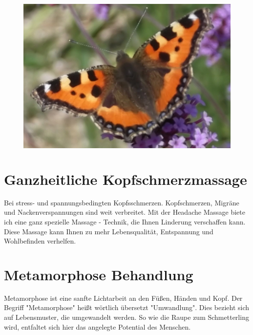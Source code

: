 \documentclass[foldmark,10pt,a4paper,notumble]{leaflet}
\begin{document}
\section{}
\begin{figure}[h]
 \includegraphics [scale=.30]{Schmetterling3.JPG}
 \end{figure}


\section{Ganzheitliche Kopfschmerzmassage}

Bei stress- und spannungsbedingten Kopfsschmerzen. 
Kopfschmerzen, Migräne und Nackenverspannungen sind weit verbreitet. Mit der Headache Massage biete ich eine ganz spezielle Massage - Technik, die Ihnen Linderung verschaffen kann. Diese Massage kann Ihnen zu mehr Lebensqualität, Entspannung und Wohlbefinden verhelfen. 

\section{Metamorphose Behandlung}

Metamorphose ist eine sanfte Lichtarbeit an den Füßen, Händen und Kopf. Der Begriff "Metamorphose" heißt wörtlich übersetzt "Umwandlung". Dies bezieht sich auf Lebensmuster, die umgewandelt werden. So wie die Raupe zum Schmetterling wird, entfaltet sich hier das angelegte Potential des Menschen.\\
\end{document}
